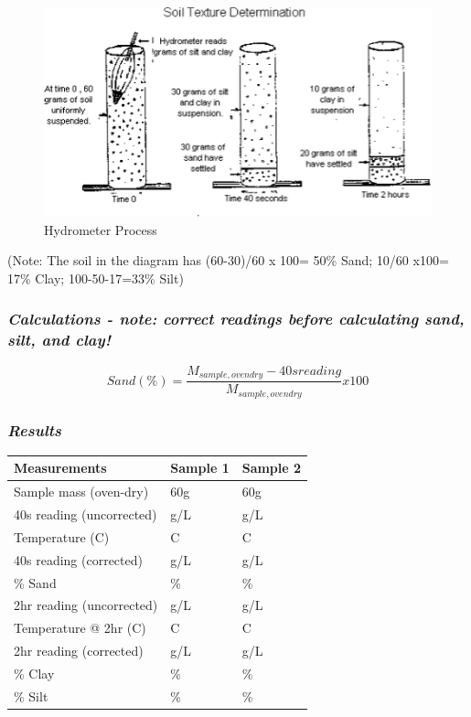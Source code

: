 \documentclass[
  letterpaper,
  DIV=11,
  numbers=noendperiod]{scrreprt}
\begin{document}
\begin{figure}

{\centering \includegraphics{./hydrometer-Picture1.png}

}

\caption{\label{fig-hydrometer}Hydrometer Process}

\end{figure}

(Note: The soil in the diagram has (60-30)/60 x 100= 50\% Sand; 10/60
x100= 17\% Clay; 100-50-17=33\% Silt)

\hypertarget{calculations---note-correct-readings-before-calculating-sand-silt-and-clay}{%
\subsubsection{\texorpdfstring{\emph{Calculations - note: correct
readings before calculating sand, silt, and
clay!}}{Calculations - note: correct readings before calculating sand, silt, and clay!}}\label{calculations---note-correct-readings-before-calculating-sand-silt-and-clay}}

\[
Sand (\%) = \frac{M_{sample,ovendry} - 40s reading}{M_{sample,ovendry}} x 100%
\]

\hypertarget{results}{%
\subsubsection{\texorpdfstring{\emph{Results}}{Results}}\label{results}}

\begin{longtable}[]{@{}lll@{}}
\toprule()
\textbf{Measurements} & \textbf{Sample 1} & \textbf{Sample 2} \\
\midrule()
\endhead
Sample mass (oven-dry) & 60g & 60g \\
40s reading (uncorrected) & g/L & g/L \\
Temperature (C) & C & C \\
40s reading (corrected) & g/L & g/L \\
\% Sand & \% & \% \\
2hr reading (uncorrected) & g/L & g/L \\
Temperature @ 2hr (C) & C & C \\
2hr reading (corrected) & g/L & g/L \\
\% Clay & \% & \% \\
\% Silt & \% & \% \\
\bottomrule()
\end{longtable}
\end{document}
